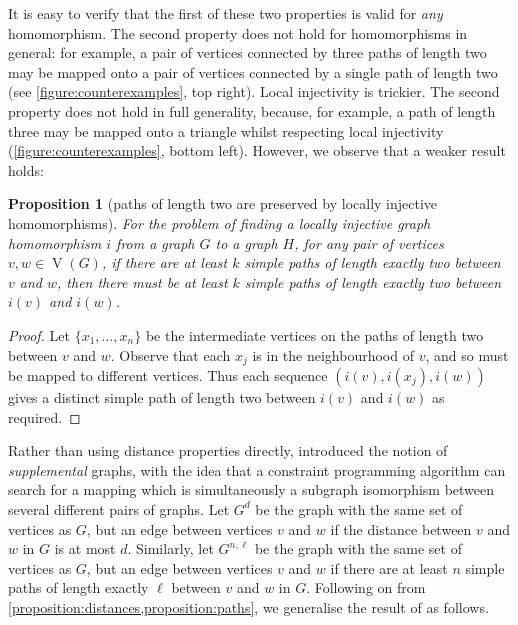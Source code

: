 \documentclass{article}
\newtheorem{proposition}{Proposition}
\newcommand{\citet}[1]{\citeauthor{#1} \shortcite{#1}}
\newcommand{\vertexset}{\operatorname{V}}
\begin{document}
It is easy to verify that the first of these two properties is valid for \emph{any} homomorphism.
The second property does not hold for homomorphisms in general: for example, a pair of vertices
connected by three paths of length two may be mapped onto a pair of vertices connected by a single
path of length two (see \cref{figure:counterexamples}, top right). Local injectivity is trickier.
The second property does not hold in full generality, because, for example, a path of length three
may be mapped onto a triangle whilst respecting local injectivity (\cref{figure:counterexamples},
bottom left).  However, we observe that a weaker result holds:

\begin{proposition}[paths of length two are preserved by locally injective
    homomorphisms]\label{proposition:paths}For the problem of finding a locally injective graph
    homomorphism $i$ from a graph $G$ to a graph $H$, for any pair of vertices $v, w \in
    \vertexset(G)$, if there are at least $k$ simple paths of length exactly two between $v$ and
    $w$, then there must be at least $k$ simple paths of length exactly two between $i(v)$ and
    $i(w)$.
\end{proposition}

\begin{proof}Let $\{ x_1, \ldots, x_n \}$ be the intermediate vertices on the paths of length two
between $v$ and $w$. Observe that each $x_j$ is in the neighbourhood of $v$, and so must be mapped
    to different vertices. Thus each sequence $(i(v), i(x_j), i(w))$ gives a distinct simple path of
length two between $i(v)$ and $i(w)$ as required.\end{proof}

Rather than using distance properties directly, \citet{DBLP:conf/cp/McCreeshP15} introduced
the notion of \emph{supplemental} graphs, with the idea that a constraint programming algorithm can
search for a mapping which is simultaneously a subgraph isomorphism between several different pairs
of graphs. Let $G^d$ be the graph with the same set of vertices as $G$, but an edge between vertices
$v$ and $w$ if the distance between $v$ and $w$ in $G$ is at most $d$.  Similarly, let $G^{n,\ell}$
be the graph with the same set of vertices as $G$, but an edge between vertices $v$ and $w$ if there
are at least $n$ simple paths of length exactly $\ell$ between $v$ and $w$ in $G$. Following on from
\cref{proposition:distances,proposition:paths}, we generalise the result of
\citeauthor{DBLP:conf/cp/McCreeshP15} as follows.
\end{document}
